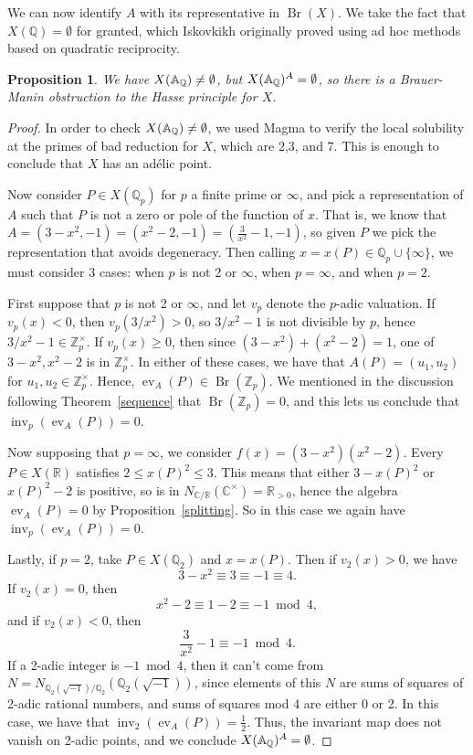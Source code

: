 \documentclass[12pt,twoside]{reedthesis}
\theoremstyle{plain}
\newtheorem{proposition}[theorem]{Proposition}
\theoremstyle{definition}
\theoremstyle{remark}
\newcommand{\ZZ}{\mathbb{Z}}
\newcommand{\Affine}{\mathbb{A}}
\newcommand{\QQ}{\mathbb{Q}}
\newcommand{\RR}{\mathbb{R}}
\newcommand{\CC}{\mathbb{C}}
\newcommand{\Br}{\operatorname{Br}}
\newcommand{\adele}{\reflectbox{$\Affine$}}
\newcommand{\ev}{\operatorname{ev}}
\newcommand{\inv}{\operatorname{inv}}
\begin{document}
\noindent We can now identify $A$ with its representative in $\Br(X)$. We take the fact that $X(\QQ)=\emptyset$ for granted, which Iskovkikh originally proved using ad hoc methods based on quadratic reciprocity.
\begin{proposition}
We have $X(\adele_\QQ)\neq\emptyset$, but $X(\adele_\QQ)^A=\emptyset$, so there is a Brauer-Manin obstruction to the Hasse principle for $X$.
\end{proposition}
\begin{proof}
In order to check $X(\adele_\QQ)\neq\emptyset$, we used Magma to verify the local solubility at the primes of bad reduction for $X$, which are 2,3, and 7. This is enough to conclude that $X$ has an ad\'elic point.

Now consider $P\in X(\QQ_p)$ for $p$ a finite prime or $\infty$, and pick a representation of $A$ such that $P$ is not a zero or pole of the function of $x$. That is, we know that $A=(3-x^2,-1)=(x^2-2,-1)=(\frac{3}{x^2}-1,-1)$, so given $P$ we pick the representation that avoids degeneracy. Then calling $x=x(P)\in\QQ_p\cup\{\infty\}$, we must consider 3 cases: when $p$ is not 2 or $\infty$, when $p=\infty$, and when $p=2$.

First suppose that $p$ is not 2 or $\infty$, and let $v_p$ denote the $p$-adic valuation. If $v_p(x)<0$, then $v_p(3/x^2)>0$, so $3/x^2-1$ is not divisible by $p$, hence $3/x^2-1\in\ZZ_p^\times$. If $v_p(x)\geq0$, then since $(3-x^2)+(x^2-2)=1$, one of $3-x^2,x^2-2$ is in $\ZZ_p^\times$. In either of these cases, we have that $A(P)=(u_1,u_2)$ for $u_1,u_2\in\ZZ_p^\times$. Hence, $\ev_A(P)\in\Br(\ZZ_p)$. We mentioned in the discussion following Theorem~\ref{sequence} that $\Br(\ZZ_p)=0$, and this lets us conclude that $\inv_p(\ev_A(P))=0$.

Now supposing that $p=\infty$, we consider $f(x)=(3-x^2)(x^2-2)$. Every $P\in X(\RR)$ satisfies $2\leq x(P)^2\leq 3$. This means that either $3-x(P)^2$ or $x(P)^2-2$ is positive, so is in $N_{\CC/\RR}(\CC^\times)=\RR_{>0}$, hence the algebra $\ev_A(P)=0$ by Proposition~\ref{splitting}. So in this case we again have $\inv_p(\ev_A(P))=0$.

Lastly, if $p=2$, take $P\in X(\QQ_2)$ and $x=x(P)$. Then if $v_2(x)>0$, we have
\[
3-x^2\equiv3\equiv-1\equiv4.
\]
If $v_2(x)=0$, then
\[
x^2-2\equiv1-2\equiv-1\bmod4,
\]
and if $v_2(x)<0$, then
\[
\frac{3}{x^2}-1\equiv-1\bmod4.
\]
If a 2-adic integer is $-1\bmod4$, then it can't come from $ N=N_{\QQ_2(\sqrt{-1})/\QQ_2}(\QQ_2(\sqrt{-1}))$, since elements of this $N$ are sums of squares of 2-adic rational numbers, and sums of squares mod 4 are either 0 or 2. In this case, we have that $\inv_2(\ev_A(P))=\frac{1}{2}$. Thus, the invariant map does not vanish on 2-adic points, and we conclude $X(\adele_\QQ)^A=\emptyset$.
\end{proof}
\end{document}
